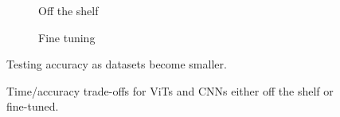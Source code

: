 \begin{figure*}
    \centering
    \begin{subfigure}{0.45\textwidth}
    \def\svgwidth{7.7cm}
    
    \caption{Off the shelf}
    \label{results:img:ots_scale}
    \end{subfigure}
    \hfill
    \begin{subfigure}{0.45\textwidth}
    \def\svgwidth{7.7cm}
    
    \caption{Fine tuning}
    \label{results:img:ft_scale}
    \end{subfigure}
    \caption{Testing accuracy as datasets become smaller.}
\end{figure*}

\begin{figure}
    \centering
    \def\svgwidth{7.7cm}
    
    \caption{Time/accuracy trade-offs for ViTs and CNNs either off the shelf or fine-tuned.}
    \label{results:img:ots_vs_ft_type}
\end{figure}


